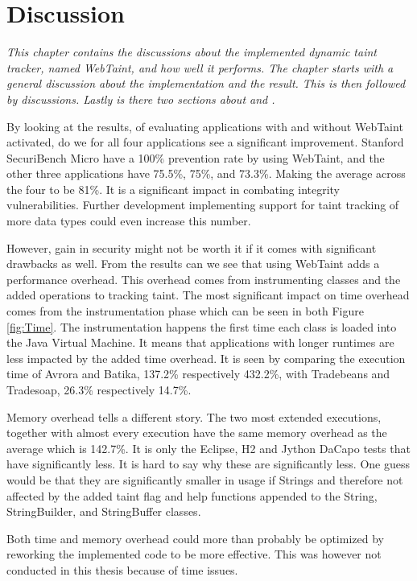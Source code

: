 \chapter{Discussion}
\label{Discussion}
\textit{This chapter contains the discussions about the implemented dynamic taint tracker, named WebTaint, and how well it performs. The chapter starts with a general discussion about the implementation and the result. This is then followed by \textit{} discussions. Lastly is there two sections about \textit{} and \textit{}.}

By looking at the results, of evaluating applications with and without WebTaint activated, do we for all four applications see a significant improvement. Stanford SecuriBench Micro have a 100\% prevention rate by using WebTaint, and the other three applications have 75.5\%, 75\%, and 73.3\%. Making the average across the four to be 81\%. It is a significant impact in combating integrity vulnerabilities. Further development implementing support for taint tracking of more data types could even increase this number.

However, gain in security might not be worth it if it comes with significant drawbacks as well. From the results can we see that using WebTaint adds a performance overhead. This overhead comes from instrumenting classes and the added operations to tracking taint. The most significant impact on time overhead comes from the instrumentation phase which can be seen in both Figure \ref{fig:Time}. The instrumentation happens the first time each class is loaded into the Java Virtual Machine. It means that applications with longer runtimes are less impacted by the added time overhead. It is seen by comparing the execution time of Avrora and Batika, 137.2\% respectively 432.2\%, with Tradebeans and Tradesoap, 26.3\% respectively 14.7\%.

Memory overhead tells a different story. The two most extended executions, together with almost every execution have the same memory overhead as the average which is 142.7\%. It is only the Eclipse, H2 and Jython DaCapo tests that have significantly less. It is hard to say why these are significantly less. One guess would be that they are significantly smaller in usage if Strings and therefore not affected by the added taint flag and help functions appended to the String, StringBuilder, and StringBuffer classes.

Both time and memory overhead could more than probably be optimized by reworking the implemented code to be more effective. This was however not conducted in this thesis because of time issues.


